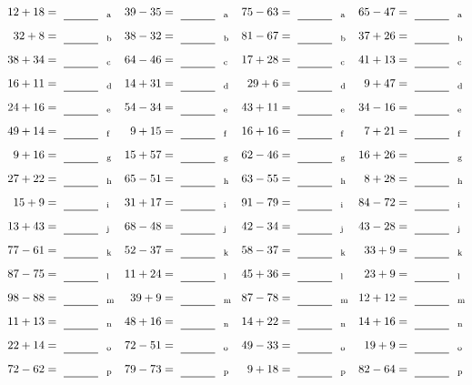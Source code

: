 \documentclass
[
  draft    = true,
  fontsize = 11pt,
  parskip  = half-
]
{scrartcl}
\begin{document}
\clearpage
\begin{align*}
    \pline{12+18}&=\rline{a}
  & \pline{39-35}&=\rline{a}
  & \pline{75-63}&=\rline{a}
  & \pline{65-47}&=\rline{a} \\[1ex]
    \pline{32+8}&=\rline{b}
  & \pline{38-32}&=\rline{b}
  & \pline{81-67}&=\rline{b}
  & \pline{37+26}&=\rline{b} \\[1ex]
    \pline{38+34}&=\rline{c}
  & \pline{64-46}&=\rline{c}
  & \pline{17+28}&=\rline{c}
  & \pline{41+13}&=\rline{c} \\[1ex]
    \pline{16+11}&=\rline{d}
  & \pline{14+31}&=\rline{d}
  & \pline{29+6}&=\rline{d}
  & \pline{9+47}&=\rline{d} \\[1ex]
    \pline{24+16}&=\rline{e}
  & \pline{54-34}&=\rline{e}
  & \pline{43+11}&=\rline{e}
  & \pline{34-16}&=\rline{e} \\[1ex]
    \pline{49+14}&=\rline{f}
  & \pline{9+15}&=\rline{f}
  & \pline{16+16}&=\rline{f}
  & \pline{7+21}&=\rline{f} \\[1ex]
    \pline{9+16}&=\rline{g}
  & \pline{15+57}&=\rline{g}
  & \pline{62-46}&=\rline{g}
  & \pline{16+26}&=\rline{g} \\[1ex]
    \pline{27+22}&=\rline{h}
  & \pline{65-51}&=\rline{h}
  & \pline{63-55}&=\rline{h}
  & \pline{8+28}&=\rline{h} \\[1ex]
    \pline{15+9}&=\rline{i}
  & \pline{31+17}&=\rline{i}
  & \pline{91-79}&=\rline{i}
  & \pline{84-72}&=\rline{i} \\[1ex]
    \pline{13+43}&=\rline{j}
  & \pline{68-48}&=\rline{j}
  & \pline{42-34}&=\rline{j}
  & \pline{43-28}&=\rline{j} \\[1ex]
    \pline{77-61}&=\rline{k}
  & \pline{52-37}&=\rline{k}
  & \pline{58-37}&=\rline{k}
  & \pline{33+9}&=\rline{k} \\[1ex]
    \pline{87-75}&=\rline{l}
  & \pline{11+24}&=\rline{l}
  & \pline{45+36}&=\rline{l}
  & \pline{23+9}&=\rline{l} \\[1ex]
    \pline{98-88}&=\rline{m}
  & \pline{39+9}&=\rline{m}
  & \pline{87-78}&=\rline{m}
  & \pline{12+12}&=\rline{m} \\[1ex]
    \pline{11+13}&=\rline{n}
  & \pline{48+16}&=\rline{n}
  & \pline{14+22}&=\rline{n}
  & \pline{14+16}&=\rline{n} \\[1ex]
    \pline{22+14}&=\rline{o}
  & \pline{72-51}&=\rline{o}
  & \pline{49-33}&=\rline{o}
  & \pline{19+9}&=\rline{o} \\[1ex]
    \pline{72-62}&=\rline{p}
  & \pline{79-73}&=\rline{p}
  & \pline{9+18}&=\rline{p}
  & \pline{82-64}&=\rline{p}
\end{align*}
\end{document}
